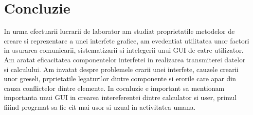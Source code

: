 \section*{Concluzie}

	In urma efectuarii lucrarii de laborator am studiat proprietatile metodelor de creare si reprezentare a unei interfete grafice, am evedentiat utilitatea unor factori in usurarea comunicarii, sistematizarii si intelegerii unui GUI de catre utilizator. Am aratat  eficacitatea componentelor interfetei in realizarea transmiterei datelor si calculului. Am invatat despre problemele crarii unei interfete, cauzele crearii unor greseli, prprietatile legaturilor dintre componente si erorile care apar din cauza conflictelor dintre elemente. In cocnluzie e important sa mentionam importanta unui GUI in crearea intereferentei dintre calculator si user, primul fiiind progrmat sa fie cit mai usor si uzual in activitatea umana.



\clearpage